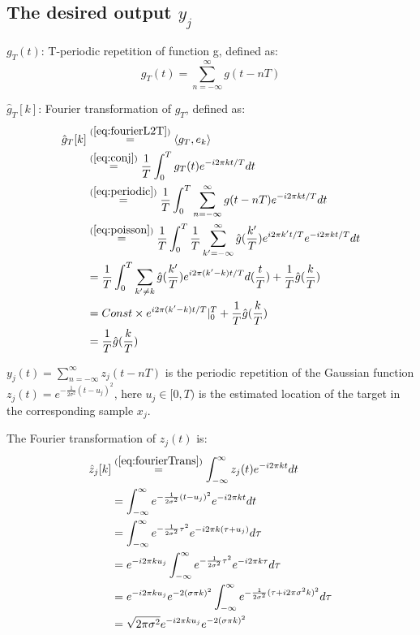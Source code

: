 \documentclass[12pt]{article}
\numberwithin{equation}{section}
\begin{document}
\subsection{The desired output $y_j$} 
$g_T(t)$: T-periodic repetition of function g, defined as:
\begin{equation} \label{eq:periodic}
	g_T(t) = \sum^{\infty}_{n=-\infty} g(t-nT)
\end{equation} \par
$\hat{g}_T[k]$: Fourier transformation of $g_T$, defined as:
\begin{align}\begin{split}\label{eq:fouriergT}
	\hat{g}_T[k] 
	&\stackrel{(\ref{eq:fourierL2T})}{=}  \langle g_T , e_k \rangle \\
	&\stackrel{(\ref{eq:conj})}{=} \frac{1}{T} \int^{T}_{0} g_T(t) e^{-i 2 \pi k t / T} dt \\ 
	&\stackrel{(\ref{eq:periodic})}{=} \frac{1}{T} \int^{T}_{0} \sum^{\infty}_{n=-\infty} g(t-nT) e^{-i 2 \pi k t / T} dt \\
	&\stackrel{(\ref{eq:poisson})}{=} \frac{1}{T} \int^{T}_{0} \frac{1}{T} \sum^{\infty}_{k'=-\infty} \hat{g}(\frac{k'}{T}) e^{i 2 \pi k' t / T}  e^{-i 2 \pi k t / T} dt \\
	&\stackrel{}{=} \frac{1}{T}  \int^{T}_{0} \sum_{k' \neq k} \hat{g}(\frac{k'}{T}) e^{i 2 \pi (k'-k) t / T} d(\frac{t}{T}) +  \frac{1}{T} \hat{g}(\frac{k}{T})\\
	&= Const \times e^{i 2 \pi (k'-k) t / T} |^T_0+  \frac{1}{T} \hat{g}(\frac{k}{T})\\
	&= \frac{1}{T} \hat{g}(\frac{k}{T})
\end{split}\end{align} \par
$y_j(t)=\sum^{\infty}_{n=-\infty}z_j(t-nT)$ is the periodic repetition of the Gaussian function $z_j(t)=e^{-\frac{1}{2\sigma^2}(t-u_j)^2}$, here $u_j \in [0, T)$ is the estimated location of the target in the corresponding sample $x_j$. \par
The Fourier transformation of $z_j(t)$ is: 
\begin{align}\begin{split}\label{eq:fourierz}
	\hat{z}_j[k]
	&\stackrel{(\ref{eq:fourierTrans})}{=} \int^{\infty}_{-\infty} z_j(t) e^{-i 2 \pi k t} dt \\ 
	&\stackrel{}{=} \int^{\infty}_{-\infty} e^{-\frac{1}{2\sigma^2}(t-u_j)^2} e^{-i 2 \pi k t} dt \\ 
	&\stackrel{}{=} \int^{\infty}_{-\infty} e^{-\frac{1}{2\sigma^2}\tau^2} e^{-i 2 \pi k (\tau+u_j)} d\tau \\ 
	&\stackrel{}{=} e^{-i 2 \pi k u_j} \int^{\infty}_{-\infty} e^{-\frac{1}{2\sigma^2}\tau^2} e^{-i 2 \pi k \tau} d\tau \\ 
	&\stackrel{}{=} e^{-i 2 \pi k u_j} e^{-2(\sigma \pi k)^2} \int^{\infty}_{-\infty} e^{-\frac{1}{2\sigma^2}(\tau+ i 2 \pi \sigma^2 k)^2} d\tau \\ 
	&\stackrel{}{=} \sqrt{2\pi\sigma^2}e^{-i 2 \pi k u_j} e^{-2(\sigma \pi k)^2} 
\end{split}\end{align} \par
\end{document}
